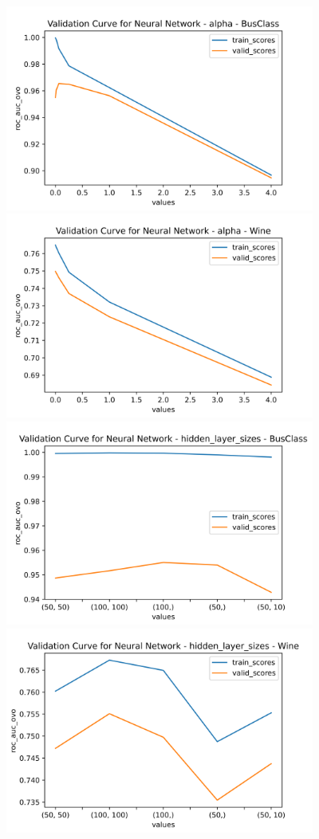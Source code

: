 \documentclass[
	letterpaper, %
]{jdf}
\begin{document}
\includegraphics[width=4in]{Figures/BusClass-0920/NN/val_curve_0.png}
\includegraphics[width=4in]{Figures/Wine-0921/NN/val_curve_0.png}
\includegraphics[width=4in]{Figures/BusClass-0920/NN/val_curve_1.png}
\includegraphics[width=4in]{Figures/Wine-0921/NN/val_curve_1.png}
\end{document}
